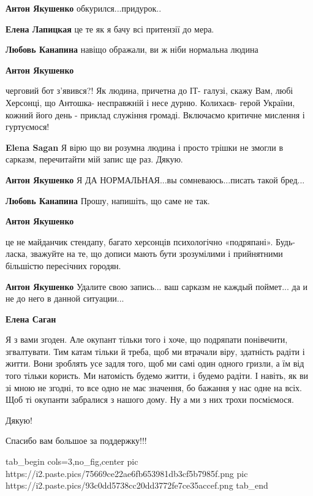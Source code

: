\begin{itemize}
\begin{itemize}
\textbf{Антон Якушенко} обкурился...придурок..

\textbf{Елена Лапицкая} це те як я бачу всі притензії до мера.

\textbf{Любовь Канапина} навіщо ображали, ви ж ніби нормальна людина

\textbf{Антон Якушенко} 

черговий бот з'явився?! Як людина, причетна до ІТ- галузі, скажу Вам, любі
Херсонці, що Антошка- несправжній і несе дурню. Колихаєв- герой України, кожний
його день - приклад служіння громаді. Включаємо критичне мислення і гуртуємося!

\textbf{Elena Sagan} Я вірю що ви розумна людина і просто трішки не змогли в сарказм, перечитайти мій запис ще раз. Дякую.

\textbf{Антон Якушенко} Я ДА НОРМАЛЬНАЯ...вы сомневаюсь...писать такой бред...

\textbf{Любовь Канапина} Прошу, напишіть, що саме не так.

\textbf{Антон Якушенко} 

це не майданчик стендапу, багато херсонців психологічно «подряпані». Будь-
ласка, зважуйте на те, що дописи мають бути зрозумілими і прийнятними більшістю
пересічних городян.

\textbf{Антон Якушенко} Удалите свою запись... ваш сарказм не каждый поймет... да и не до него в данной ситуации...

\textbf{Елена Саган} 

Я з вами згоден. Але окупант тільки того і хоче, що подряпати понівечити,
згвалтувати. Тим катам тільки й треба, щоб ми втрачали віру, здатність радіти і
житти. Вони зроблять усе задля того, щоб ми самі один одного гризли, а їм від
того тільки користь. Ми натомість будемо житти, і будемо радіти. І навіть, як
ви зі мною не згодні, то все одно не має значення, бо бажання у нас одне на
всіх. Щоб ті окупанти забралися з нашого дому. Ну а ми з них трохи посміємося.

\end{itemize} %

Дякую!

Спасибо вам большое за поддержку!!!


\ifcmt
  tab_begin cols=3,no_fig,center
     pic https://i2.paste.pics/75669ce22ae6fb653981db3cf5b7985f.png
		 pic https://i2.paste.pics/93c0dd5738cc20dd3772fe7ce35accef.png
  tab_end
\fi


\end{itemize}
